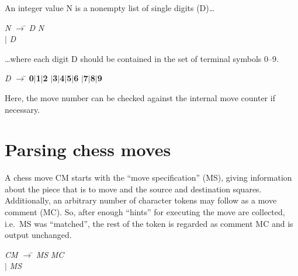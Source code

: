 \documentclass[a4paper]{article}
\def\abbrev#1{\textsf{#1}}
\def\bnf#1{\textit{#1}}
\def\bnfterm#1{\textbf{#1}}
\def\bnfprod{$\rightarrow$}
\def\bnfor{$|$}
\begin{document}
An integer value \abbrev{N} is a nonempty list of single digits 
(\abbrev{D})\ldots

\begin{center}
\begin{minipage}{3cm}
\begin{tabbing}
\bnf{N} \bnfprod\={} \bnf{D} \bnf{N}\\
 \>\bnfor{} \bnf{D}
\end{tabbing}
\end{minipage}
\end{center}

\ldots where each digit \abbrev{D} should be contained in the set of terminal
symbols 0--9.

\begin{center}
\begin{minipage}{5cm}
\begin{tabbing}
\bnf{D} \bnfprod\={} \bnfterm{0}\bnfor\bnfterm{1}\bnfor\bnfterm{2}%
\bnfor\bnfterm{3}\bnfor\bnfterm{4}\bnfor\bnfterm{5}\bnfor\bnfterm{6}%
\bnfor\bnfterm{7}\bnfor\bnfterm{8}\bnfor\bnfterm{9}
\end{tabbing}
\end{minipage}
\end{center}

Here, the move number can be checked against the internal move counter
if necessary.

\section*{Parsing chess moves}

A chess move \abbrev{CM} starts with the ``move specification'' (\abbrev{MS}),
giving information about the piece that is to move and the source and
destination squares. Additionally, an arbitrary number of character tokens may follow
as a move comment (\abbrev{MC}). So, after enough ``hints'' for executing the move
are collected, i.e.~\abbrev{MS} was ``matched'', the rest of the token is regarded
as comment \abbrev{MC} and is output unchanged.

\begin{center}
\begin{minipage}{3cm}
\begin{tabbing}
\bnf{CM} \bnfprod\={} \bnf{MS} \bnf{MC}\\
 \>\bnfor{} \bnf{MS}
\end{tabbing}
\end{minipage}
\end{center}
\end{document}
